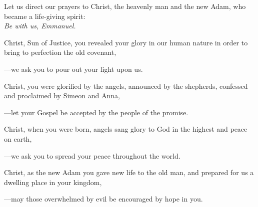 \intercessions\indent

\begin{hangpar}

Let us direct our prayers to Christ, the heavenly man and the new Adam, who became a life-giving spirit:\\
\emph{Be with us, Emmanuel.}

\medskip Christ, Sun of Justice, you revealed your glory in our human nature in order to bring to perfection the old covenant,

{\color{red}---\thinspace}we ask you to pour out your light upon us.

\medskip Christ, you were glorified by the angels, announced by the shepherds, confessed and proclaimed by Simeon and Anna,

{\color{red}---\thinspace}let your Gospel be accepted by the people of the promise.

\medskip Christ, when you were born, angels sang glory to God in the highest and peace on earth,

{\color{red}---\thinspace}we ask you to spread your peace throughout the world.

\medskip Christ, as the new Adam you gave new life to the old man, and prepared for us a dwelling place in your kingdom,

{\color{red}---\thinspace}may those overwhelmed by evil be encouraged by hope in you.

\medskip

\end{hangpar}
